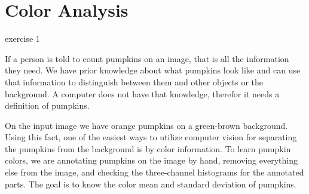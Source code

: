 \documentclass[../Head/Main.tex]{subfiles}
\begin{document}
\section{Color Analysis}
exercise 1

If a person is told to count pumpkins on an image, that is all the information they need.
We have prior knowledge about what pumpkins look like and can use that information to distinguish between them and other objects or the background.
A computer does not have that knowledge, therefor it needs a definition of pumpkins.

On the input image we have orange pumpkins on a green-brown background.
Using this fact, one of the easiest ways to utilize computer vision for separating the pumpkins from the background is by color information.
To learn pumpkin colors, we are annotating pumpkins on the image by hand, removing everything else from the image, and checking the three-channel histograms for the annotated parts.
The goal is to know the color mean and standard deviation of pumpkins.
\end{document}
